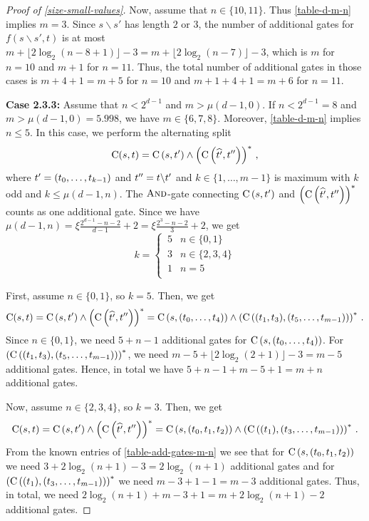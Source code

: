 \begin{proof}[Proof of \cref{size-small-values}]
 Now, assume that $n \in \{10,11\}$. Thus \cref{table-d-m-n} implies $m=3$.
 Since $s \backslash s'$ has length $2$ or $3$,
 the number of additional gates for $f(s \backslash s', t)$ is at most
 $m + \lfloor 2 \log_2(n-8+1)\rfloor - 3 = m + \lfloor 2 \log_2(n-7)\rfloor - 3$,
 which is $m$ for $n=10$ and $m+1$ for $n=11$. Thus, the total number of additional
 gates in those cases is $m + 4 + 1 = m + 5$ for $n=10$ and 
 $m + 1 + 4 + 1 = m + 6$ for $n=11$.

\textbf{Case 2.3.3:} Assume that $n < 2^{d-1}$ and $m > \mu(d-1, 0)$.
If $n < 2^{d-1} = 8$ and $m > \mu(d-1, 0) = 5.998$, we have $m \in \{6,7,8\}$.
Moreover, \cref{table-d-m-n} implies $n \leq 5$. 
In this case, we perform the alternating split
\[
\depthckt(s, t) = \depthckt\Bkt{s, \prefix{t}{k}} \land \Bkt{\depthckt\Bkt{\everysecond{\prefix{t}{k}}, \suffix{t}{k}}}^*\,,
\]
where
$\prefix{t}{k} = \Bkt{t_0, \dotsc, t_{k-1}}$ and $\suffix{t}{k} = t \backslash \prefix{t}{k}$
and $k \in \{1,\dots,m-1\}$ is maximum with $k$ odd and $k \leq \mu(d-1, n)$.
The $\AND{}$-gate connecting $\depthckt\Bkt{s, \prefix{t}{k}}$ and
$\Bkt{\depthckt\Bkt{\everysecond{\prefix{t}{k}}, \suffix{t}{k}}}^*$
counts as one additional gate.
Since we have 
$\mu(d-1, n) = \xi\frac{2^{d-1} -n -2 }{d-1} + 2 = \xi\frac{2^{3} -n -2 }{3} + 2$, 
we get
\[
 k =
\begin{cases} \, 5 & n\in \{0,1\}\\
 \, 3 & n \in \{2,3,4\}\\
 \, 1 & n = 5\\
\end{cases}
\]

First, assume $n\in \{0,1\}$, so $k=5$. Then, we get 
\[
\depthckt(s, t) = \depthckt\Bkt{s, \prefix{t}{k}} \land \Bkt{\depthckt\Bkt{\everysecond{\prefix{t}{k}}, \suffix{t}{k}}}^*
  = \depthckt\Bkt{s, (t_0,\dots,t_4)} \land \Bkt{\depthckt\Bkt{(t_1,t_3),(t_5,\dots,t_{m-1})}}^*\,.
\]
Since $n\in \{0,1\}$, we need $5+n-1$ additional gates for $\depthckt\Bkt{s, (t_0,\dots,t_4)}$.
For $\Bkt{\depthckt\Bkt{(t_1,t_3),(t_5,\dots,t_{m-1})}}^*$, we need 
$m-5 + \lfloor 2 \log_2(2+1) \rfloor - 3 = m - 5$ additional gates.
Hence, in total  we have $5+n-1+m-5+1 = m+n$ additional gates.

Now, assume $n\in \{2,3,4\}$, so $k=3$. Then, we get 
\[
\depthckt(s, t) = \depthckt\Bkt{s, \prefix{t}{k}} \land \Bkt{\depthckt\Bkt{\everysecond{\prefix{t}{k}}, \suffix{t}{k}}}^*
  = \depthckt\Bkt{s, (t_0,t_1,t_2)} \land \Bkt{\depthckt\Bkt{(t_1),(t_3,\dots,t_{m-1})}}^*\,.
\]
From the known entries of \cref{table-add-gates-m-n} we see that
for $\depthckt\Bkt{s, (t_0,t_1,t_2)}$ we need $3 + 2\log_2(n+1) - 3 = 2\log_2(n+1)$ additional gates
and for $\Bkt{\depthckt\Bkt{(t_1),(t_3,\dots,t_{m-1})}}^*$ we need $m - 3 + 1 - 1 = m - 3$ additional
gates. Thus, in total, we need $2\log_2(n+1) + m - 3 + 1 = m +  2\log_2(n+1) - 2$ additional gates.


\end{proof}

